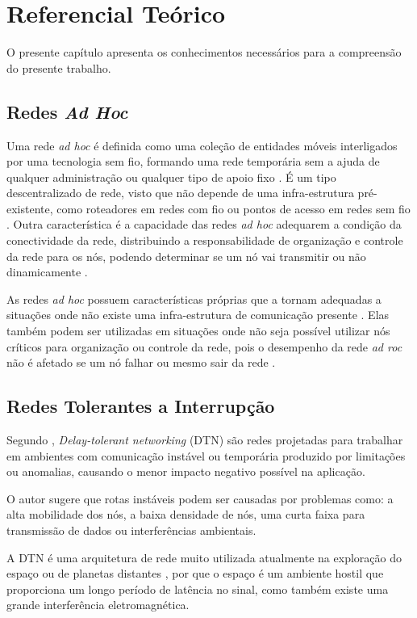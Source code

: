 \section{Referencial Teórico}

O presente capítulo apresenta os conhecimentos necessários para a compreensão do presente trabalho. 

\subsection{Redes \emph{Ad Hoc}}

Uma rede \emph{ad hoc} é definida como uma coleção de entidades móveis interligados por uma tecnologia sem fio, formando uma rede temporária sem a ajuda de qualquer administração ou qualquer tipo de apoio fixo \cite{Zafoune:2007}. É um tipo descentralizado de rede, visto que não depende de uma infra-estrutura pré-existente, como roteadores em redes com fio ou pontos de acesso em redes sem fio \cite{Niazi:2009}. Outra característica é a capacidade das redes \emph{ad hoc} adequarem a condição da conectividade da rede, distribuindo a responsabilidade de organização e controle da rede para os nós, podendo determinar se um nó vai transmitir ou não dinamicamente \cite{Rezende:2008}.

As redes \emph{ad hoc} possuem características próprias que a tornam adequadas a situações onde não existe uma infra-estrutura de comunicação presente \cite{Niculescu:2003}. Elas também podem ser utilizadas em situações onde não seja possível utilizar nós críticos para organização ou controle da rede, pois o desempenho da rede \emph{ad roc} não é afetado se um nó falhar ou mesmo sair da rede \cite{Dressler:2008}.

\subsection{Redes Tolerantes a Interrupção}
Segundo \cite{Nichols:2007}, \emph{Delay-tolerant networking} (DTN) são redes projetadas para trabalhar em ambientes com comunicação instável ou temporária produzido por limitações ou anomalias, causando o menor impacto negativo possível na aplicação. 

O autor \cite{Burgess:2006} sugere que rotas instáveis podem ser causadas por problemas como: a alta mobilidade dos nós, a baixa densidade de nós, uma curta faixa para transmissão de dados ou interferências ambientais.

A DTN é uma arquitetura de rede muito utilizada atualmente na exploração do espaço ou de planetas distantes \cite{Spyropoulos:2010}, por que o espaço é um ambiente hostil que proporciona um longo período de latência no sinal, como também existe uma grande interferência eletromagnética.

